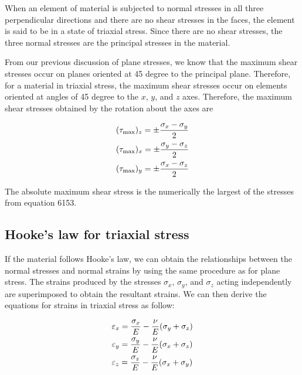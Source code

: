 \documentclass[
fontsize=10pt,
a4paper,
twosides=false,
open=any,
svgnames,
]{kaobook} %
\begin{document}
When an element of material is subjected to normal stresses in all three perpendicular directions and there are no shear stresses in the faces, the element is said to be in a state of triaxial stress. Since there are no shear stresses, the three normal stresses are the principal stresses in the material.

From our previous discussion of plane stresses, we know that the maximum shear stresses occur on planes oriented at 45 degree to the principal plane. Therefore, for a material in triaxial stress, the maximum shear stresses occur on elements oriented at angles of 45 degree to the $x$, $y$, and $z$ axes. Therefore, the maximum shear stresses obtained by the rotation about the axes are

\begin{equation}
  \begin{gathered}
    (\tau_{\max })_z =  \pm \frac{\sigma_x - \sigma_y}{2} \hfill \\
    (\tau_{\max })_x =  \pm \frac{\sigma_y - \sigma_z}{2} \hfill \\
    (\tau_{\max })_y =  \pm \frac{\sigma_x - \sigma_z}{2} \hfill \\ 
  \end{gathered}
\end{equation}

The absolute maximum shear stress is the numerically the largest of the stresses from equation 6153.

\subsection{Hooke’s law for triaxial stress}

If the material follows Hooke’s law, we can obtain the relationships between the normal stresses and normal strains by using the same procedure as for plane stress. The strains produced by the stresses $\sigma_x$, $\sigma_y$, and $\sigma_z$ acting independently are superimposed to obtain the resultant strains. We can then derive the equations for strains in triaxial stress as follow:

\begin{equation}
  \begin{gathered}
    \varepsilon_x = \frac{\sigma_x}{E} - \frac{\nu }{E}(\sigma_y + \sigma_z) \hfill \\
    \varepsilon_y = \frac{\sigma_y}{E} - \frac{\nu }{E}(\sigma_x + \sigma_z) \hfill \\
    \varepsilon_z = \frac{\sigma_z}{E} - \frac{\nu }{E}(\sigma_x + \sigma_y) \hfill 
  \end{gathered}
\end{equation}
\end{document}
